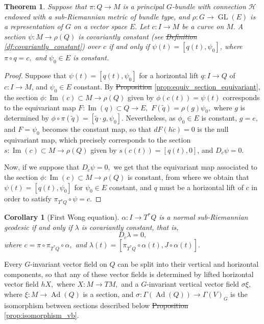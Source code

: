 \documentclass[12pt, letterpaper, reqno]{amsart}
\theoremstyle{definition}
\theoremstyle{plain}
\newtheorem{thm}{Theorem}
\newtheorem{cor}{Corollary}
\theoremstyle{remark}
\providecommand{\DIFadd}[1]{{\protect\color{blue}\uwave{#1}}} %
\providecommand{\DIFdel}[1]{{\protect\color{red}\sout{#1}}}                      %
\providecommand{\DIFaddbegin}{} %
\providecommand{\DIFaddend}{} %
\providecommand{\DIFdelbegin}{} %
\providecommand{\DIFdelend}{} %
\newcommand{\DIFscaledelfig}{0.5}
\newlength{\DIFdelgraphicswidth} %
\newlength{\DIFdelgraphicsheight} %
\newcommand{\DIFaddincludegraphics}[2][]{{\color{blue}\fbox{\DIFOincludegraphics[#1]{#2}}}} %
\newcommand{\DIFdelincludegraphics}[2][]{%
\sbox{\DIFdelgraphicsbox}{\DIFOincludegraphics[#1]{#2}}%
\settoboxwidth{\DIFdelgraphicswidth}{\DIFdelgraphicsbox} %
\settoboxtotalheight{\DIFdelgraphicsheight}{\DIFdelgraphicsbox} %
\scalebox{\DIFscaledelfig}{%
\parbox[b]{\DIFdelgraphicswidth}{\usebox{\DIFdelgraphicsbox}\\[-\baselineskip] \rule{\DIFdelgraphicswidth}{0em}}\llap{\resizebox{\DIFdelgraphicswidth}{\DIFdelgraphicsheight}{%
\setlength{\unitlength}{\DIFdelgraphicswidth}%
\begin{picture}(1,1)%
\thicklines\linethickness{2pt} %
{\color[rgb]{1,0,0}\put(0,0){\framebox(1,1){}}}%
{\color[rgb]{1,0,0}\put(0,0){\line( 1,1){1}}}%
{\color[rgb]{1,0,0}\put(0,1){\line(1,-1){1}}}%
\end{picture}%
}\hspace*{3pt}}} %
} %
\DeclareRobustCommand{\DIFaddbegin}{\DIFOaddbegin \let\includegraphics\DIFaddincludegraphics} %
\DeclareRobustCommand{\DIFaddend}{\DIFOaddend \let\includegraphics\DIFOincludegraphics} %
\DeclareRobustCommand{\DIFdelbegin}{\DIFOdelbegin \let\includegraphics\DIFdelincludegraphics} %
\DeclareRobustCommand{\DIFdelend}{\DIFOaddend \let\includegraphics\DIFOincludegraphics} %
\begin{document}
\begin{thm}
	Suppose that $ \pi: Q \rightarrow M $  is a principal $ G $-bundle with connection $ \mathcal{H} $ endowed with a sub-Riemannian metric of bundle type,  and $ \rho: G \rightarrow \operatorname{GL} (E) $ is a representation of $ G $ on a vector space $ E. $ Let $ c: I \rightarrow M $ be a curve on $ M. $ A section $ \psi: M \rightarrow \rho(Q) $   is covariantly constant (see \DIFdelbegin \DIFdel{Definition }\DIFdelend \DIFaddbegin \DIFadd{definition }\DIFaddend \ref{df:covariantly_constant}) over $ c $  if and only if $ \psi(t)= [q(t), \psi_0] $, where $ \pi\circ q = c,  $ and $ \psi_0\in E $ is constant.
\end{thm}
\begin{proof}
	Suppose that $ \psi(t)= [q(t), \psi_0] $ for a horizontal lift $ q: I \rightarrow Q $ of $ c: I \rightarrow M $, and $ \psi_0\in E $ constant. By \DIFdelbegin \DIFdel{Proposition }\DIFdelend \DIFaddbegin \DIFadd{proposition }\DIFaddend \ref{prop:equiv_section_equivariant}, the section $ \phi: \operatorname{Im} (c)\subset M \rightarrow \rho(Q) $ given by $ \phi(c(t))=\psi(t) $ corresponds to the equivariant map $ F: \operatorname{Im} (q)  \subset Q \rightarrow E, $ $ F(\tilde q)= \rho(g)\psi_0, $ where $ g $ is determined by $ \phi\circ\pi(\tilde q) = [\tilde q \cdot g, \psi_0]. $ Nevertheless, as $ \phi_0\in E $ is constant, $ g=e, $ and $ F=\psi_0 $ becomes the constant map, so that $ dF(h\dot{c})=0 $ is the null equivariant map, which precisely corresponds to the section $ s: \operatorname{Im} (c) \subset M \rightarrow \rho(Q) $ given by $ s(c(t)) =[q(t), 0] $, and $ D_{\dot{c}}\psi=0. $ 

	Now, if we suppose that $ D_{\dot{c}}\psi=0, $ we get that the equivariant map associated to the section $ \phi: \operatorname{Im} (c)\subset M \rightarrow \rho(Q) $ is constant, from where we obtain that $ \psi(t)=[q(t), \psi_0] $ for $ \psi_0\in E $ constant, and $ q $ must be a horizontal lift of $ c $ in order to satisfy $ \pi_{T^*Q}\circ\psi =c. $ 
\end{proof}

\DIFdelbegin %
\DIFdelend \DIFaddbegin \begin{cor}[First Wong equation]\DIFaddend \label{cor:fwe}
	$\alpha: I \rightarrow T^*Q$ is a normal sub-Riemannian geodesic if and only if $ \lambda$ is covariantly constant, that is, $$ D_{\dot{c}}\lambda =0, $$ where $ c=\pi\circ\pi_{T^*Q}\circ\alpha, $ and $ \lambda(t)=[ \pi_{T^*Q}\circ\alpha(t), J\circ\alpha(t)]. $ 
\end{cor}
Every $ G $-invariant vector field on $ Q $ can be split into their vertical and horizontal components, so that any of these vector fields is determined by lifted horizontal vector field $ hX, $ where $ X: M \rightarrow TM, $ and a $ G $-invariant vertical vector field $ \sigma\xi, $ where $ \xi: M \rightarrow \operatorname{Ad} (Q) $ is a section, and $ \sigma: \Gamma( \operatorname{Ad} (Q)) \rightarrow \Gamma(V)_G $ is the isomorphism between sections described below \DIFdelbegin \DIFdel{Proposition }\DIFdelend \DIFaddbegin \DIFadd{proposition }\DIFaddend \ref{prop:isomorphism_vb}.
\end{document}

